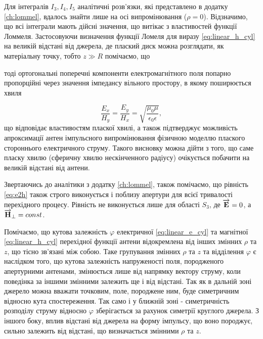 Для інтегралів $ I_3, I_4, I_5 $ аналітичні розв'язки, які представлено в 
додатку \ref{ch:lommel}, вдалось знайти лише на осі випромінювання 
($ \rho = 0 $). Відзначимо, що всі інтеграли мають дійсні значення, що витікає
з властивостей функції Ломмеля. Застосовуючи визначення функції Ломеля для  
виразу \eqref{eq:linear_h_cyl} на великій відстані від джерела, де плаский 
диск можна розглядати, як матеріальну точку, тобто $ z \gg R $ помічаємо, що 

%
тоді ортогональні поперечні компоненти електромагнітного поля попарно 
пропорційні через значення імпедансу вільного простору, в якому 
поширюється хвиля

\begin{equation} \label{eq:e2h}
\frac{E_x}{H_y} = \frac{E_y}{H_x} = 
\sqrt{\frac{\mu_0 \mu}{\epsilon_0 \epsilon}},
\end{equation}
%
що відповідає властивостям пласкої хвилі, а також підтверджує можливість 
апроксимації антен імпульсного випромінювання фізичною моделлю плаского 
стороннього електричного струму. Такого висновку можна дійти з того, що
саме пласку хвилю (сферичну хвилю нескінченного радіусу) очікується побачити 
на великій відстані від антени.

Звертаючись до аналітики з додатку \ref{ch:lommel}, також помічаємо, що 
рівність \eqref{eq:e2h} також строго виконується і поблизу апертури для 
всієї тривалості перехідного процесу. Рівність не виконується лише для 
області $ S_3 $, де $ \overrightarrow{\mathbf E} = 0 $, а $ \overrightarrow{\mathbf H}_\perp = const $.

Помічаємо, що кутова залежність $ \varphi $ електричної 
\eqref{eq:linear_e_cyl} та магнітної \eqref{eq:linear_h_cyl} перехідної 
функції антени відокремлена від інших змінних $ \rho $ та $ z $, що тісно 
зв'язані між собою. Таке групування змінних $ \rho $ та $ z $ та відділення 
$ \varphi $ є наслідком того, що кутова залежність напруженості поля, 
породженого апертурними антенами, змінюється лише від напрямку вектору 
струму, коли поведінка за іншими змінними залежить ще і від відстані.
Так як в дальній зоні джерело можна вважати точковим, поле, породжене ним, 
буде симетричним відносно кута спостереження. Так само і у ближній зоні -
симетричність розподілу струму відносно $ \varphi $ зберігається за рахунок
симетрії круглого джерела. З іншого боку, вплив відстані від джерела на 
форму імпульсу, що воно породжує, сильно залежить від відстані, що 
визначається змінними $ \rho $ та $ z $.

